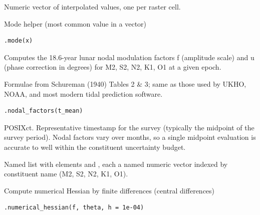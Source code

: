 \documentclass[a4paper]{book}
\begin{document}
%
\begin{Value}
Numeric vector of interpolated values, one per raster cell.
\end{Value}
%
\begin{Description}
Mode helper (most common value in a vector)
\end{Description}
%
\begin{Usage}
\begin{verbatim}
.mode(x)
\end{verbatim}
\end{Usage}
%
\begin{Description}
Computes the 18.6-year lunar nodal modulation factors f (amplitude scale)
and u (phase correction in degrees) for M2, S2, N2, K1, O1 at a given epoch.

Formulae from Schureman (1940) Tables 2 \& 3; same as those used by
UKHO, NOAA, and most modern tidal prediction software.
\end{Description}
%
\begin{Usage}
\begin{verbatim}
.nodal_factors(t_mean)
\end{verbatim}
\end{Usage}
%
\begin{Arguments}
\begin{ldescription}
\item[\code{t\_mean}] POSIXct. Representative timestamp for the survey (typically
the midpoint of the survey period). Nodal factors vary over months, so
a single midpoint evaluation is accurate to well within the constituent
uncertainty budget.
\end{ldescription}
\end{Arguments}
%
\begin{Value}
Named list with elements  and , each a named numeric vector
indexed by constituent name (M2, S2, N2, K1, O1).
\end{Value}
%
\begin{Description}
Compute numerical Hessian by finite differences (central differences)
\end{Description}
%
\begin{Usage}
\begin{verbatim}
.numerical_hessian(f, theta, h = 1e-04)
\end{verbatim}
\end{Usage}
\end{document}
